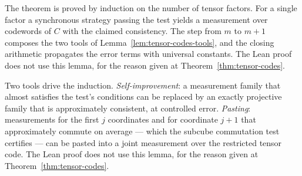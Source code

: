 \effortHard

\begin{lemma}
\label{lem:tensor-codes-induction}
The theorem is proved by induction on the number of tensor factors. For a single factor a
synchronous strategy passing the test yields a measurement over codewords of $C$ with the
claimed consistency. The step from $m$ to $m+1$ composes the two tools of
Lemma~\ref{lem:tensor-codes-tools}, and the closing arithmetic propagates the error terms with
universal constants.
The Lean proof does not use this lemma, for the reason given at
Theorem~\ref{thm:tensor-codes}.
\end{lemma}

\effortHard

\begin{lemma}
\label{lem:tensor-codes-tools}
Two tools drive the induction. \emph{Self-improvement}: a measurement family that almost
satisfies the test's conditions can be replaced by an exactly projective family that is
approximately consistent, at controlled error. \emph{Pasting}: measurements for the first $j$
coordinates and for coordinate $j+1$ that approximately commute on average --- which the
subcube commutation test certifies --- can be pasted into a joint measurement over the
restricted tensor code.
The Lean proof does not use this lemma, for the reason given at
Theorem~\ref{thm:tensor-codes}.
\end{lemma}

\effortHard

